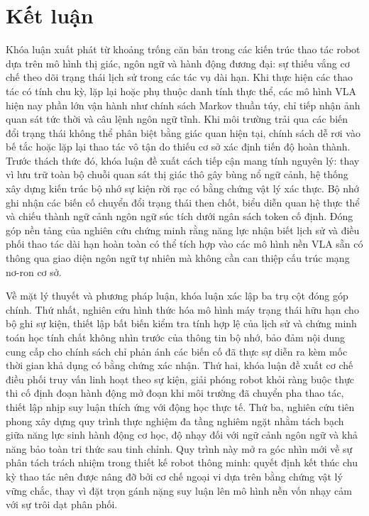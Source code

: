 \chapter{Kết luận}

Khóa luận xuất phát từ khoảng trống căn bản trong các kiến trúc thao tác robot dựa trên mô hình thị giác, ngôn ngữ và hành động đương đại: sự thiếu vắng cơ chế theo dõi trạng thái lịch sử trong các tác vụ dài hạn. Khi thực hiện các thao tác có tính chu kỳ, lặp lại hoặc phụ thuộc danh tính thực thể, các mô hình VLA hiện nay phần lớn vận hành như chính sách Markov thuần túy, chỉ tiếp nhận ảnh quan sát tức thời và câu lệnh ngôn ngữ tĩnh. Khi môi trường trải qua các biến đổi trạng thái không thể phân biệt bằng giác quan hiện tại, chính sách dễ rơi vào bế tắc hoặc lặp lại thao tác vô tận do thiếu cơ sở xác định tiến độ hoàn thành. Trước thách thức đó, khóa luận đề xuất cách tiếp cận mang tính nguyên lý: thay vì lưu trữ toàn bộ chuỗi quan sát thị giác thô gây bùng nổ ngữ cảnh, hệ thống xây dựng kiến trúc bộ nhớ sự kiện rời rạc có bằng chứng vật lý xác thực. Bộ nhớ ghi nhận các biến cố chuyển đổi trạng thái then chốt, biểu diễn quan hệ thực thể và chiếu thành ngữ cảnh ngôn ngữ súc tích dưới ngân sách token cố định. Đóng góp nền tảng của nghiên cứu chứng minh rằng năng lực nhận biết lịch sử và điều phối thao tác dài hạn hoàn toàn có thể tích hợp vào các mô hình nền VLA sẵn có thông qua giao diện ngôn ngữ tự nhiên mà không cần can thiệp cấu trúc mạng nơ-ron cơ sở.

Về mặt lý thuyết và phương pháp luận, khóa luận xác lập ba trụ cột đóng góp chính. Thứ nhất, nghiên cứu hình thức hóa mô hình máy trạng thái hữu hạn cho bộ ghi sự kiện, thiết lập bất biến kiểm tra tính hợp lệ của lịch sử và chứng minh toán học tính chất không nhìn trước của thông tin bộ nhớ, bảo đảm nội dung cung cấp cho chính sách chỉ phản ánh các biến cố đã thực sự diễn ra kèm mốc thời gian khả dụng có bằng chứng xác nhận. Thứ hai, khóa luận đề xuất cơ chế điều phối truy vấn linh hoạt theo sự kiện, giải phóng robot khỏi ràng buộc thực thi cố định đoạn hành động mở đoạn khi môi trường đã chuyển pha thao tác, thiết lập nhịp suy luận thích ứng với động học thực tế. Thứ ba, nghiên cứu tiên phong xây dựng quy trình thực nghiệm đa tầng nghiêm ngặt nhằm tách bạch giữa năng lực sinh hành động cơ học, độ nhạy đối với ngữ cảnh ngôn ngữ và khả năng bảo toàn tri thức sau tinh chỉnh. Quy trình này mở ra góc nhìn mới về sự phân tách trách nhiệm trong thiết kế robot thông minh: quyết định kết thúc chu kỳ thao tác nên được nâng đỡ bởi cơ chế ngoại vi dựa trên bằng chứng vật lý vững chắc, thay vì đặt trọn gánh nặng suy luận lên mô hình nền vốn nhạy cảm với sự trôi dạt phân phối.

